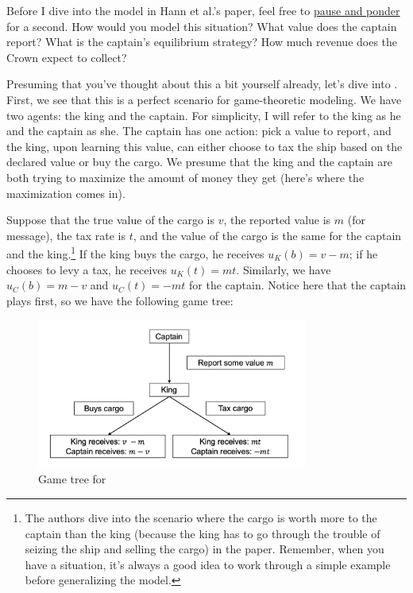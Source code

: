 Before I dive into the model in Hann et al.'s paper, feel free to \href{https://pbs.twimg.com/media/C1hNo_KUcAAJDQ9.jpg:large}{pause and ponder} for a second. How would you model this situation? What value does the captain report? What is the captain's equilibrium strategy? How much revenue does the Crown expect to collect?

Presuming that you've thought about this a bit yourself already, let's dive into \citet{Haan_2012_Taxation}. First, we see that this is a perfect scenario for game-theoretic modeling. We have two agents: the king and the captain. For simplicity, I will refer to the king as he and the captain as she. The captain has one action: pick a value to report, and the king, upon learning this value, can either choose to tax the ship based on the declared value or buy the cargo. We presume that the king and the captain are both trying to maximize the amount of money they get (here's where the maximization comes in). 

Suppose that the true value of the cargo is $v$, the reported value is $m$ (for message), the tax rate is $t$, and the value of the cargo is the same for the captain and the king.\footnote{The authors dive into the scenario where the cargo is worth more to the captain than the king (because the king has to go through the trouble of seizing the ship and selling the cargo) in the paper. Remember, when you have a situation, it's always a good idea to work through a simple example before generalizing the model.} If the king buys the cargo, he receives $u_K(b) = v - m$; if he chooses to levy a tax, he receives $u_K(t) = mt$. Similarly, we have $u_C(b) = m - v$ and $u_C(t) = -mt$ for the captain. Notice here that the captain plays first, so we have the following game tree:

\begin{figure}[H]
    \caption{Game tree for \citet{Haan_2012_Taxation}}
    \centering
    \includegraphics[width = 3.5in]{taxgamertree.png}
\end{figure}

